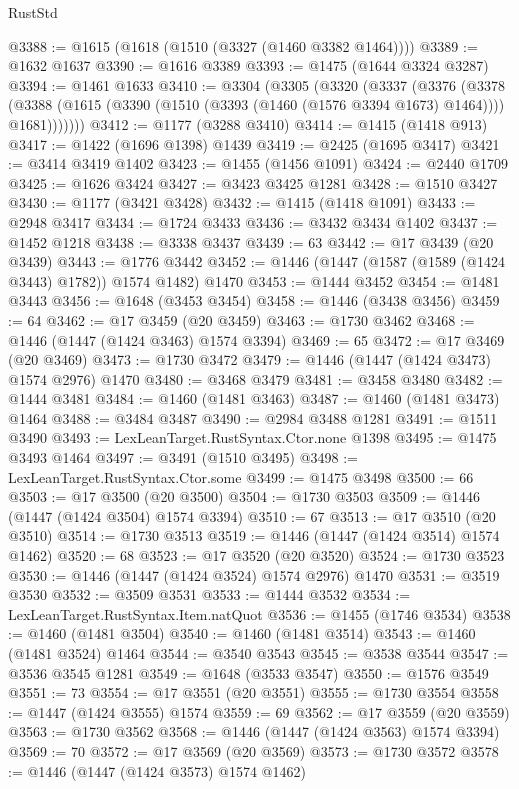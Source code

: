 \begin{lexlean}{RustStd}
\begin{coremodule}
@3388 := @1615 (@1618 (@1510 (@3327 (@1460 @3382 @1464))))
@3389 := @1632 @1637
@3390 := @1616 @3389
@3393 := @1475 (@1644 @3324 @3287)
@3394 := @1461 @1633
@3410 := @3304
    (@3305
      (@3320
        (@3337
          (@3376
            (@3378
              (@3388 (@1615 (@3390 (@1510 (@3393 (@1460 (@1576 @3394 @1673) @1464)))) @1681)))))))
@3412 := @1177 (@3288 @3410)
@3414 := @1415 (@1418 @913)
@3417 := @1422 (@1696 @1398) @1439
@3419 := @2425 (@1695 @3417)
@3421 := @3414 @3419 @1402
@3423 := @1455 (@1456 @1091)
@3424 := @2440 @1709
@3425 := @1626 @3424
@3427 := @3423 @3425 @1281
@3428 := @1510 @3427
@3430 := @1177 (@3421 @3428)
@3432 := @1415 (@1418 @1091)
@3433 := @2948 @3417
@3434 := @1724 @3433
@3436 := @3432 @3434 @1402
@3437 := @1452 @1218
@3438 := @3338 @3437
@3439 := 63
@3442 := @17 @3439 (@20 @3439)
@3443 := @1776 @3442
@3452 := @1446 (@1447 (@1587 (@1589 (@1424 @3443) @1782)) @1574 @1482) @1470
@3453 := @1444 @3452
@3454 := @1481 @3443
@3456 := @1648 (@3453 @3454)
@3458 := @1446 (@3438 @3456)
@3459 := 64
@3462 := @17 @3459 (@20 @3459)
@3463 := @1730 @3462
@3468 := @1446 (@1447 (@1424 @3463) @1574 @3394)
@3469 := 65
@3472 := @17 @3469 (@20 @3469)
@3473 := @1730 @3472
@3479 := @1446 (@1447 (@1424 @3473) @1574 @2976) @1470
@3480 := @3468 @3479
@3481 := @3458 @3480
@3482 := @1444 @3481
@3484 := @1460 (@1481 @3463)
@3487 := @1460 (@1481 @3473) @1464
@3488 := @3484 @3487
@3490 := @2984 @3488 @1281
@3491 := @1511 @3490
@3493 := LexLeanTarget.RustSyntax.Ctor.none @1398
@3495 := @1475 @3493 @1464
@3497 := @3491 (@1510 @3495)
@3498 := LexLeanTarget.RustSyntax.Ctor.some
@3499 := @1475 @3498
@3500 := 66
@3503 := @17 @3500 (@20 @3500)
@3504 := @1730 @3503
@3509 := @1446 (@1447 (@1424 @3504) @1574 @3394)
@3510 := 67
@3513 := @17 @3510 (@20 @3510)
@3514 := @1730 @3513
@3519 := @1446 (@1447 (@1424 @3514) @1574 @1462)
@3520 := 68
@3523 := @17 @3520 (@20 @3520)
@3524 := @1730 @3523
@3530 := @1446 (@1447 (@1424 @3524) @1574 @2976) @1470
@3531 := @3519 @3530
@3532 := @3509 @3531
@3533 := @1444 @3532
@3534 := LexLeanTarget.RustSyntax.Item.natQuot
@3536 := @1455 (@1746 @3534)
@3538 := @1460 (@1481 @3504)
@3540 := @1460 (@1481 @3514)
@3543 := @1460 (@1481 @3524) @1464
@3544 := @3540 @3543
@3545 := @3538 @3544
@3547 := @3536 @3545 @1281
@3549 := @1648 (@3533 @3547)
@3550 := @1576 @3549
@3551 := 73
@3554 := @17 @3551 (@20 @3551)
@3555 := @1730 @3554
@3558 := @1447 (@1424 @3555) @1574
@3559 := 69
@3562 := @17 @3559 (@20 @3559)
@3563 := @1730 @3562
@3568 := @1446 (@1447 (@1424 @3563) @1574 @3394)
@3569 := 70
@3572 := @17 @3569 (@20 @3569)
@3573 := @1730 @3572
@3578 := @1446 (@1447 (@1424 @3573) @1574 @1462)

\end{coremodule}
\end{lexlean}
